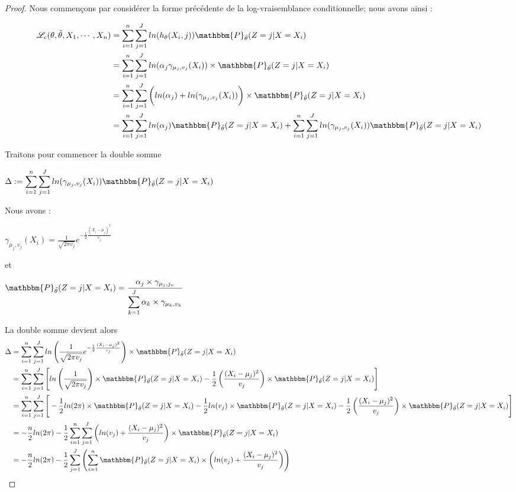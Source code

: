 \documentclass[frenchb]{report}
\newcommand{\1}{\mathbbm{1}}
\newcommand{\prob}{\mathbbm{P}}
\newcommand{\lv}{\mathcal{L}}
\newcommand{\thetat}{\tilde{\theta}}
\theoremstyle{definition}\newtheorem{defn}{Définition}
\theoremstyle{definition}\newtheorem{exm}{Exemple}
\theoremstyle{definition}\newtheorem{nota}{Notation}
\theoremstyle{definition}\newtheorem{rem}{Remarque}
\begin{document}
\begin{proof}
Nous commençons par considérer la forme précédente de la log-vraisemblance conditionnelle; nous avons ainsi : 

\begin{align*}
 \lv_{c}(\theta, \thetat, X_1, \cdots, X_n) &= \sum_{i=1}^n \sum_{j = 1}^J ln(h_\theta(X_i,j)) \prob_{\thetat} (Z = j|X = X_i)\\
&= \sum_{i=1}^n \sum_{j = 1}^J ln(\alpha_j\gamma_{\mu_j,v_j}(X_i))\times \prob_{\thetat} (Z = j|X = X_i)\\
&= \sum_{i=1}^n \sum_{j = 1}^J \bigg(ln(\alpha_j)+ln(\gamma_{\mu_j,v_j}(X_i))\bigg)\times \prob_{\thetat} (Z = j|X = X_i)\\
&= \sum_{i=1}^n \sum_{j = 1}^J ln(\alpha_j)\prob_{\thetat} (Z = j|X = X_i)+\sum_{i=1}^n \sum_{j = 1}^J ln(\gamma_{\mu_j,v_j}(X_i))\prob_{\thetat} (Z = j|X = X_i)\\
\end{align*}

Traitons pour commencer la double somme 
\begin{center} $\Delta := \displaystyle \sum_{i=1}^n \sum_{j = 1}^J ln(\gamma_{\mu_j,v_j}(X_i))\prob_{\thetat} (Z = j|X = X_i)$ \end{center}

Nous avons :
\begin{center}
$\gamma_{\mu_j,v_j}(X_i) = \frac{1}{\sqrt{2 \pi v_j}}e^{-\frac{1}{2}\frac{(X_i - \mu_j)^2}{v_j}}$
\end{center}
et
\begin{center}
$\prob_{\thetat}(Z=j | X = X_i) = \displaystyle\frac{\alpha_j\times\gamma_{\mu_j, j_v}}{\displaystyle\sum_{k=1}^J\alpha_k\times\gamma_{\mu_k, v_k}}$
\end{center}

La double somme devient alors 
\begin{align*}
\Delta &= \sum_{i=1}^n \sum_{j = 1}^J ln\left(\frac{1}{\sqrt{2 \pi v_j}}e^{-\frac{1}{2}\frac{(X_i - \mu_j)^2}{v_j}}\right)\times\prob_{\thetat} (Z = j|X = X_i) \\
&=\sum_{i=1}^n \sum_{j = 1}^J \Bigg[ ln\left(\frac{1}{\sqrt{2 \pi v_j}}\right)\times\prob_{\thetat} (Z = j|X = X_i) -\frac{1}{2}\left(\frac{(X_i - \mu_j)^2}{v_j}\right)\times\prob_{\thetat} (Z = j|X = X_i)\Bigg]\\
&=\sum_{i=1}^n \sum_{j = 1}^J \Bigg[-\frac{1}{2} ln(2\pi)\times \prob_{\thetat} (Z = j|X = X_i)-\frac{1}{2}ln(v_j)\times \prob_{\thetat} (Z = j|X = X_i) -\frac{1}{2}\left(\frac{(X_i - \mu_j)^2}{v_j}\right)\times\prob_{\thetat} (Z = j|X = X_i) \Bigg]\\
&=-\frac{n}{2}ln(2\pi)  -\frac{1}{2} \sum_{i=1}^n \sum_{j = 1}^J \left(ln(v_j) + \frac{(X_i - \mu_j)^2}{v_j}\right)\times\prob_{\thetat} (Z = j|X = X_i) \\
&=-\frac{n}{2}ln(2\pi)  -\frac{1}{2} \sum_{j=1}^J \left( \sum_{i = 1}^n \prob_{\thetat} (Z = j|X = X_i)\times \left(ln(v_j) + \frac{(X_i - \mu_j)^2}{v_j}\right)\right) \\
\end{align*}


\end{proof}
\end{document}
